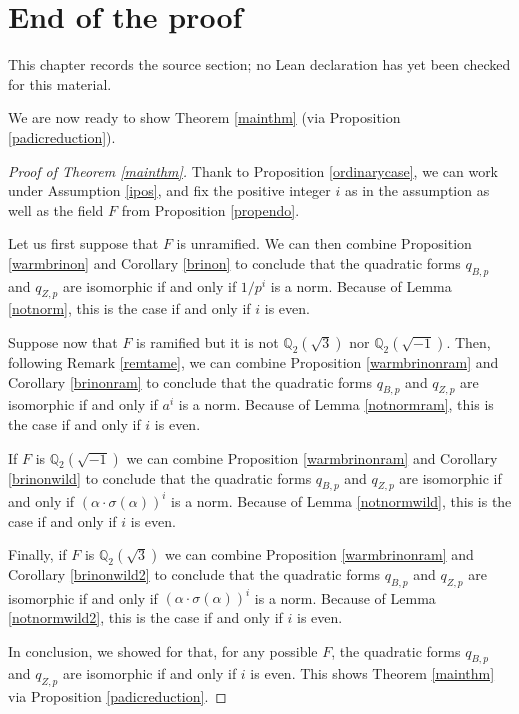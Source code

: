 \chapter{End of the proof}
\label{standard-conjectures-abelian-fourfolds-chapter-13}

\begin{remark}
\label{standard-conjectures-abelian-fourfolds-chapter-13-source}
This chapter records the source section; no Lean declaration has yet been checked for this material.
\notready
\end{remark}

\label{endpf}
We are now ready to show Theorem \ref{mainthm}  (via Proposition \ref{padicreduction}).

\begin{proof}[Proof of Theorem \ref{mainthm}]
Thank to Proposition \ref{ordinarycase}, we can work under Assumption \ref{ipos}, and fix the positive integer $i$ as in the assumption as well as the field $F$ from Proposition \ref{propendo}.

Let us first suppose that  $F$ is unramified. We can then combine Proposition \ref{warmbrinon} and Corollary \ref{brinon} to conclude that the quadratic forms  $q_{B,p}$ and $q_{Z,p}$ are isomorphic if and only if $1/p^i$ is a norm. Because of Lemma \ref{notnorm}, this is the case   if and only if $i$ is even.


Suppose now that $F$ is ramified but it is not $\mathbb{Q}_2(\sqrt{3})$ nor $\mathbb{Q}_2(\sqrt{-1})$. Then, following  Remark \ref{remtame}, we can combine Proposition \ref{warmbrinonram} and Corollary \ref{brinonram} to conclude that the quadratic forms $q_{B,p}$ and $q_{Z,p}$ are isomorphic if and only if    $ a^i$ is a norm. Because of Lemma \ref{notnormram}, this is the case   if and only if $i$ is even.

If $F$ is  $\mathbb{Q}_2(\sqrt{-1})$ we can  combine Proposition \ref{warmbrinonram} and Corollary \ref{brinonwild} to conclude that the quadratic forms $q_{B,p}$ and $q_{Z,p}$ are isomorphic if and only if    $  (\alpha  \cdot \sigma(\alpha) )^i$ is a norm. Because of Lemma \ref{notnormwild}, this is the case   if and only if $i$ is even.

Finally, if $F$ is  $\mathbb{Q}_2(\sqrt{3})$ we can  combine Proposition \ref{warmbrinonram} and Corollary \ref{brinonwild2} to conclude that the quadratic forms  $q_{B,p}$ and $q_{Z,p}$ are isomorphic if and only if    $  (\alpha  \cdot \sigma(\alpha) )^i$ is a norm. Because of Lemma \ref{notnormwild2}, this is the case   if and only if $i$ is even.


In conclusion, we showed for that, for any possible $F$, the quadratic forms $q_{B,p}$ and $q_{Z,p}$ are isomorphic if and only if $i$ is even. This shows Theorem \ref{mainthm}  via Proposition \ref{padicreduction}.
\end{proof}


